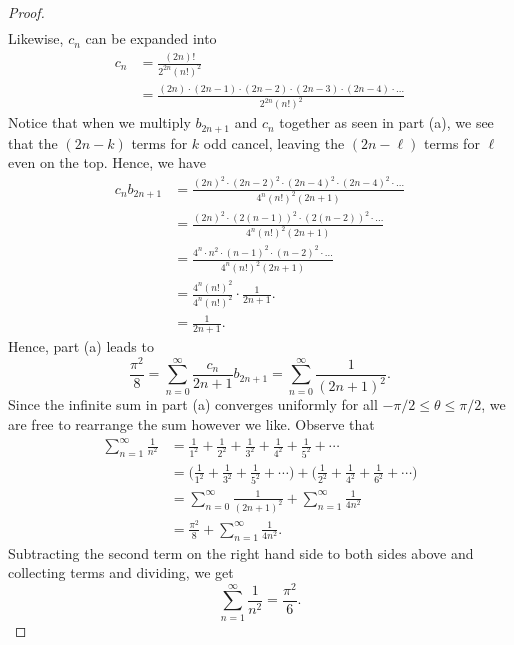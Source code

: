 \begin{enumerate}
\begin{proof}
\begin{align*}
        \end{align*}
        Likewise, \( c_{n}  \) can be expanded into 
        \begin{align*}
            c_{n} &= \frac{ (2n)!  }{ 2^{2n } (n!)^{2}  } \\  
                  &= \frac{ (2n) \cdot  (2n-1) \cdot (2n-2) \cdot (2n-3) \cdot (2n-4) \cdot \dots  }{  2^{2n} (n!)^{2}  } 
        \end{align*}
        Notice that when we multiply \( b_{2n+1}  \) and \( c_{n}  \) together as seen in part (a), we see that the \( (2n - k)  \) terms for \( k  \) odd cancel, leaving the \( (2n - \ell)   \) terms for \( \ell  \) even on the top. Hence, we have 
        \begin{align*}
            c_{n} b_{2n+1} &= \frac{ (2n)^{2} \cdot (2n-2)^{2} \cdot (2n-4)^{2} \cdot (2n-4)^{2} \cdot \dots   }{ 4^{n} (n!)^{2} (2n+1)  }  \\
                           &= \frac{  (2n)^{2}  \cdot (2 (n-1))^{2} \cdot (2(n - 2 ))^{2} \cdot \dots   }{ 4^{n} (n!)^{2} (2n+1) } \\
                           &= \frac{ 4^{n} \cdot n^{2} \cdot (n-1)^{2} \cdot (n-2)^{2}  \cdot \dots }{ 4^{n} (n!)^{2} (2n+1) } \\
                           &= \frac{ 4^{n} (n!)^{2}   }{  4^{n} (n!)^{2}  } \cdot \frac{ 1 }{ 2n+1 }.  \\
                           &= \frac{ 1 }{ 2n+1 } .
        \end{align*}
        Hence, part (a) leads to 
        \[  \frac{ \pi^{2}  }{  8  }  = \sum_{ n=0  }^{ \infty  } \frac{ c_{n}  }{ 2n+1  } b_{2n+1} =  \sum_{ n=0  }^{ \infty  } \frac{ 1 }{ (2n+1)^{2}  }. \]
            Since the infinite sum in part (a) converges uniformly for all \(  - \pi /2 \leq \theta \leq \pi /2  \), we are free to rearrange the sum however we like. Observe that
        \begin{align*}
            \sum_{ n=1  }^{ \infty  } \frac{ 1 }{ n^{2} }  &= \frac{ 1 }{ 1^{2} }  + \frac{ 1 }{ 2^{2} }  + \frac{ 1 }{ 3^{2}  }  + \frac{ 1 }{ 4^{2} }  + \frac{ 1 }{ 5^{2} } + \dotsb \\
                                                           &= \Big( \frac{ 1 }{ 1^{2} } + \frac{ 1 }{ 3^{2} } + \frac{ 1 }{ 5^{2} }  + \dotsb \Big) + \Big( \frac{ 1 }{ 2^{2} } + \frac{ 1 }{ 4^{2} }  + \frac{ 1 }{ 6^{2} } + \dotsb  \Big) \\
                                                           &= \sum_{ n= 0  }^{ \infty  } \frac{ 1 }{ (2n+1)^{2} }  + \sum_{ n=1 }^{ \infty  } \frac{ 1 }{ 4n^2 } \\
                                                           &= \frac{ \pi^{2} }{  8  }  + \sum_{ n=1  }^{ \infty  } \frac{ 1 }{ 4 n^{2} }.
        \end{align*}
        Subtracting the second term on the right hand side to both sides above and collecting terms and dividing, we get
        \[  \sum_{ n=1  }^{ \infty  } \frac{ 1 }{ n^{2} }  = \frac{ \pi^{2}  }{  6  }.  \]
        \end{proof}
\end{enumerate}

